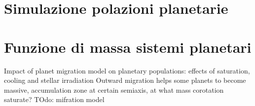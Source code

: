 {\let\clearpage\relax\let\cleardoublepage\relax
\chapter{Simulazione polazioni planetarie}
}


{\let\clearpage\relax\let\cleardoublepage\relax
\chapter{Funzione di massa sistemi planetari}
}

\begin{frame}{Impact of planet migration model on planetary populations: effects of saturation, cooling and stellar irradiation}
Outward migration helps some planets to become massive, accumulation zone at certain semiaxis, at what mass corotation saturate?
TOdo: mifration model
\end{frame}